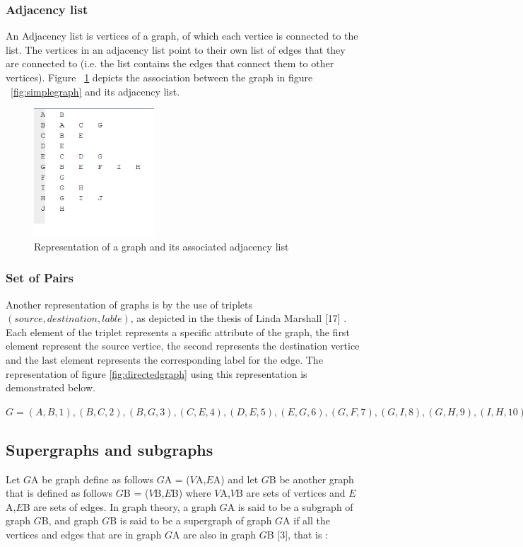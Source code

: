 \subsubsection{Adjacency list}
An Adjacency list is vertices of a graph, of which each vertice is connected to the list. The vertices in an adjacency list point to their own list of edges that they are connected to 
(i.e. the list contains the edges that connect them to other vertices).
Figure ~\ref{fig:adjacencylist} depicts the association between the graph in figure ~\ref{fig:simplegraph} and its adjacency list.
\begin{figure}[H]
  \begin{center}
      \includegraphics[width=0.4\textwidth]{list.png}
  \end{center}    
  \caption{Representation of a graph and its associated adjacency list}
  \label{fig:adjacencylist}
\end{figure}

\subsubsection{Set of Pairs}
Another representation of graphs is by the use of triplets $(source,destination,lable)$, as depicted in the thesis of Linda Marshall [17] . 
Each element of the triplet represents a specific attribute of the graph, the first element represent the source vertice, the second represents 
the destination vertice and the last element represents the corresponding label for the edge. The representation of figure \ref{fig:directedgraph} 
using this representation is demonstrated below.
\begin{myEnumerate}
  \item $G = {(A,B,1), (B,C,2), (B,G,3), (C,E,4), (D,E,5), (E,G,6), (G,F,7), (G,I,8),(G,H,9), (I,H,10), (H,I,11)}$
\end{myEnumerate}

\subsection{Supergraphs and subgraphs}
Let $G${\tiny A} be graph define as follows $G${\tiny A} = ($V${\tiny A},$E${\tiny A}) and let $G${\tiny B} be another graph that is defined as 
follows $G${\tiny B} = ($V${\tiny B},$E${\tiny B}) where $V${\tiny A},$V${\tiny B} are sets of vertices and $E${\tiny A},$E${\tiny B} are sets of edges.
In graph theory, a graph $G${\tiny A} is said to be a subgraph of graph $G${\tiny B}, and graph $G${\tiny B} is said to be a supergraph of graph 
$G${\tiny A} if all the vertices and edges that are in graph $G${\tiny A} are also in graph $G${\tiny B} [3], that is :

